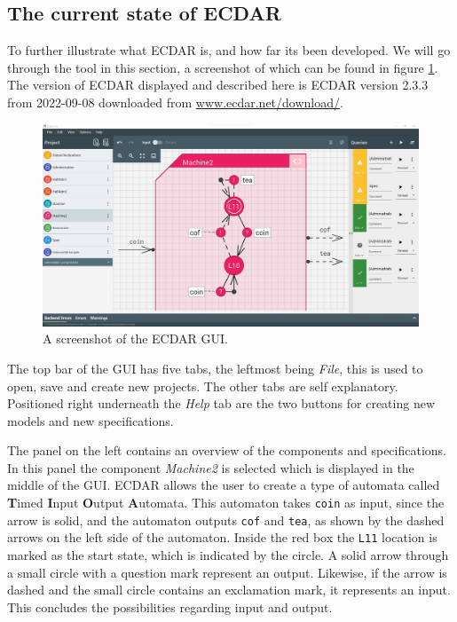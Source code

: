 \subsection{The current state of ECDAR} %
To further illustrate what ECDAR is, and how far its been developed. 
We will go through the tool in this section, a screenshot of which can be found in figure \ref{fig:ECDAR-gui}. 
The version of ECDAR displayed and described here is ECDAR version 2.3.3 from 2022-09-08 downloaded from \href{https://www.ecdar.net/download/}{www.ecdar.net/download/}.

\begin{figure}[H]
    \centering
    \includegraphics[width=1\textwidth]{common/figures/ecdar-overview.jpg}
    \caption{A screenshot of the ECDAR GUI.}
    \label{fig:ECDAR-gui}
\end{figure}
The top bar of the GUI has five tabs, the leftmost being \textit{File}, this is used to open, save and create new projects.
The other tabs are self explanatory.
Positioned right underneath the \textit{Help} tab are the two buttons for creating new models and new specifications.

The panel on the left contains an overview of the components and specifications. 
In this panel the component \textit{Machine2} is selected which is displayed in the middle of the GUI.
ECDAR allows the user to create a type of automata called \textbf{T}imed \textbf{I}nput \textbf{O}utput \textbf{A}utomata. 
This automaton takes \texttt{coin} as input, since the arrow is solid, and the automaton outputs \texttt{cof} and \texttt{tea}, as shown by the dashed arrows on the left side of the automaton.
Inside the red box the \texttt{L11} location is marked as the start state, which is indicated by the circle.
A solid arrow through a small circle with a question mark represent an output. 
Likewise, if the arrow is dashed and the small circle contains an exclamation mark, it represents an input.
This concludes the possibilities regarding input and output.

